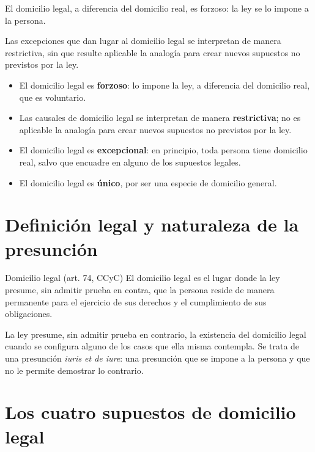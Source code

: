 \documentclass[12pt,oneside]{book}
\begin{document}
El domicilio legal, a diferencia del domicilio real, es forzoso: la ley se lo impone a la persona.

\begin{important}
Las excepciones que dan lugar al domicilio legal se interpretan de manera restrictiva, sin que resulte aplicable la analogía para crear nuevos supuestos no previstos por la ley.
\end{important}

\begin{itemize}
    \item El domicilio legal es \textbf{forzoso}: lo impone la ley, a diferencia del domicilio real, que es voluntario.
    \item Las causales de domicilio legal se interpretan de manera \textbf{restrictiva}; no es aplicable la analogía para crear nuevos supuestos no previstos por la ley.
    \item El domicilio legal es \textbf{excepcional}: en principio, toda persona tiene domicilio real, salvo que encuadre en alguno de los supuestos legales.
    \item El domicilio legal es \textbf{único}, por ser una especie de domicilio general.
\end{itemize}

\section{Definición legal y naturaleza de la presunción}

\begin{definition}{Domicilio legal (art. 74, CCyC)}
El domicilio legal es el lugar donde la ley presume, sin admitir prueba en contra, que la persona reside de manera permanente para el ejercicio de sus derechos y el cumplimiento de sus obligaciones.
\end{definition}

\begin{note}
La ley presume, sin admitir prueba en contrario, la existencia del domicilio legal cuando se configura alguno de los casos que ella misma contempla. Se trata de una presunción \textit{iuris et de iure}: una presunción que se impone a la persona y que no le permite demostrar lo contrario.
\end{note}

\section{Los cuatro supuestos de domicilio legal}
\end{document}
